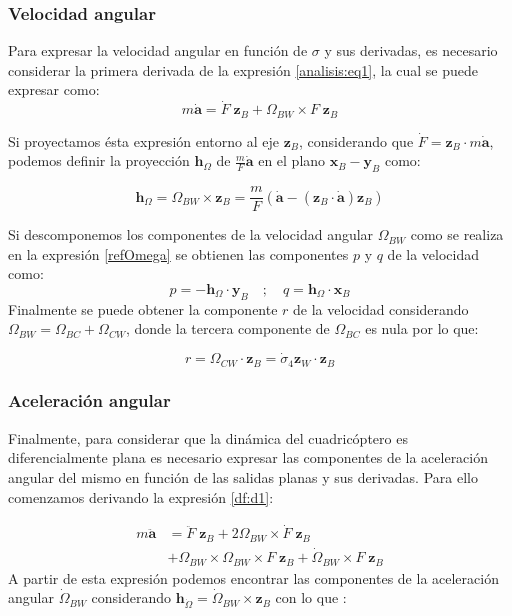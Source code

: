 \subsubsection{Velocidad angular}
Para expresar la velocidad angular en función de $\sigma$ y sus derivadas, es necesario considerar la primera derivada de la expresión \ref{analisis:eq1}, la cual se puede expresar como:
\begin{equation}
	\label{df:d1}
	m\mathbf{\dot a} = \dot F \;\mathbf{z}_B + \Omega_{BW} \times F \;\mathbf{z}_B
\end{equation}

Si proyectamos ésta expresión entorno al eje $\mathbf{z}_B$, considerando que $\dot F = \mathbf{z}_B \cdot m  \mathbf{\dot a}$, podemos definir la proyección $\textbf{h}_\Omega$ de $\frac{m}{F}\mathbf{\dot a}$ en el plano $\textbf{x}_B - \textbf{y}_B$ como:

\begin{equation}
\textbf{h}_\Omega = \Omega_{BW}\times\mathbf{z}_B = \frac{m}{F}(\mathbf{\dot a}-(\mathbf{z}_B \cdot \mathbf{\dot a})\mathbf{z}_B)
\end{equation}

Si descomponemos los componentes de la velocidad angular $\Omega_{BW}$ como se realiza en la expresión \ref{refOmega} se obtienen las componentes $p$ y $q$ de la velocidad como:
\begin{equation}
	p = -\textbf{h}_\Omega \cdot \mathbf{y}_B \quad;\quad q = \textbf{h}_\Omega \cdot \mathbf{x}_B
\end{equation}
Finalmente se puede obtener la componente $r$ de la velocidad considerando $\Omega_{BW} = \Omega_{BC} + \Omega_{CW}$, donde la tercera componente de 
$\Omega_{BC}$ es nula por lo que:

\begin{equation}
	r = \Omega_{CW} \cdot \mathbf{z}_B =  \dot \sigma_4 \mathbf{z}_W \cdot \mathbf{z}_B
\end{equation}

\subsubsection{Aceleración angular}
Finalmente, para considerar que la dinámica del cuadricóptero es diferencialmente plana es necesario expresar las componentes de la aceleración angular del mismo en función de las salidas planas y sus derivadas. Para ello comenzamos derivando la expresión \ref{df:d1}:

\begin{align}
	m\mathbf{\ddot a} &= \ddot F \;\mathbf{z}_B + 2 \Omega_{BW} \times \dot F \;\mathbf{z}_B \nonumber\\
	&+ \Omega_{BW}\times\Omega_{BW}\times F \;\mathbf{z}_B + \dot{\Omega}_{BW}\times F \;\mathbf{z}_B	\label{df:d2}
\end{align}
A partir de esta expresión podemos encontrar las componentes de la aceleración angular $\dot \Omega_{BW}$ considerando $\textbf{h}_{\dot \Omega} = {\dot\Omega_{BW} \times \mathbf{z}_B}$ con lo que :


